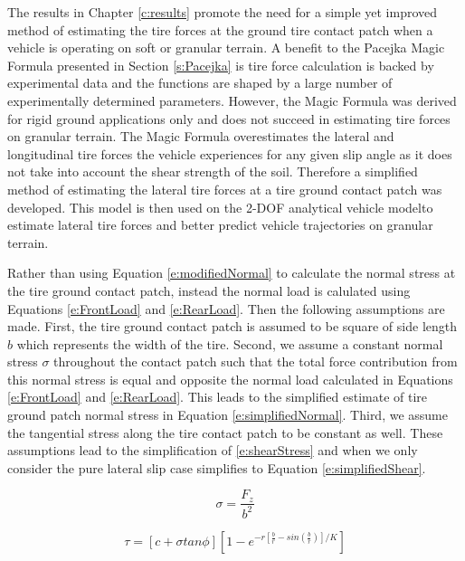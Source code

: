\documentclass[12pt,onecolumn]{report}
\begin{document}
The results in Chapter \ref{c:results} promote the need for a simple yet improved method of estimating the tire forces at the ground tire contact patch when a vehicle is operating on soft or granular terrain. A benefit to the Pacejka Magic Formula presented in Section \ref{s:Pacejka} is tire force calculation is backed by experimental data and the functions are shaped by a large number of experimentally determined parameters. However, the Magic Formula was derived for rigid ground applications only and does not succeed in estimating tire forces on granular terrain. The Magic Formula overestimates the lateral and longitudinal tire forces the vehicle experiences for any given slip angle as it does not take into account the shear strength of the soil. Therefore a simplified method of estimating the lateral tire forces at a tire ground contact patch was developed. This model is then used on the 2-DOF analytical vehicle modelto estimate lateral tire forces and better predict vehicle trajectories on granular terrain.

Rather than using Equation \ref{e:modifiedNormal} to calculate the normal stress at the tire ground contact patch, instead the normal load is calulated using Equations \ref{e:FrontLoad} and \ref{e:RearLoad}. Then the following assumptions are made. First, the tire ground contact patch is assumed to be square of side length $b$ which represents the width of the tire. Second, we assume a constant normal stress $\sigma$ throughout the contact patch such that the total force contribution from this normal stress is equal and opposite the normal load calculated in Equations \ref{e:FrontLoad} and \ref{e:RearLoad}. This leads to the simplified estimate of tire ground patch normal stress in Equation \ref{e:simplifiedNormal}. Third, we assume the tangential stress along the tire contact patch to be constant as well. These assumptions lead to the simplification of \ref{e:shearStress} and when we only consider the pure lateral slip case simplifies to Equation \ref{e:simplifiedShear}.

\begin{equation}\label{e:simplifiedNormal}
\sigma = \frac{F_z}{b^2}
\end{equation}

\begin{equation}\label{e:simplifiedShear}
\tau = [c+\sigma tan\phi][1 - e^{-r[\frac{b}{r} - sin\left(\frac{b}{r}\right)]/K}]
\end{equation}
\end{document}
